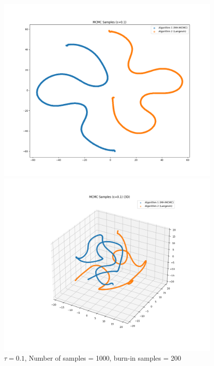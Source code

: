 \documentclass[a4paper,12pt]{article}
\begin{document}
\begin{figure}[H]
  \centering
  \begin{minipage}{0.48\textwidth}
    \includegraphics[width=\linewidth]{TASK-0-1/images/samples_eps0.1_n1000_burn200_tsne_2d.png}
  \end{minipage}
  \hfill
  \begin{minipage}{0.48\textwidth}
    \includegraphics[width=\linewidth]{TASK-0-1/images/samples_eps0.1_n1000_burn200_tsne_3d.png}
  \end{minipage}
  \caption{$\tau = 0.1$, Number of samples = 1000, burn-in samples = 200}
\end{figure}
\end{document}
